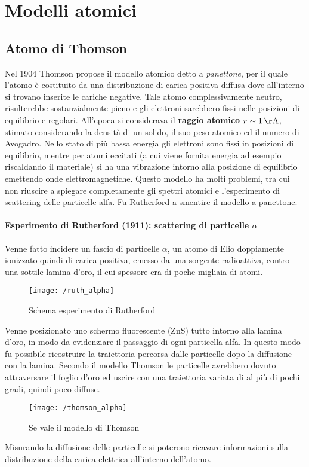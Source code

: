 
\section{Modelli atomici}


\subsection{Atomo di Thomson}
Nel 1904 Thomson propose il modello atomico detto a \textit{panettone}, per il quale l'atomo è costituito da una distribuzione di carica positiva diffusa dove all'interno si trovano inserite le cariche negative.
Tale atomo complessivamente neutro, risulterebbe sostanzialmente pieno e gli elettroni sarebbero fissi nelle posizioni di equilibrio e regolari. 
All'epoca si considerava il \textbf{raggio atomico} $r \sim \SI{1}{\AA}$, stimato considerando la densità di un solido, il suo peso atomico ed il numero di Avogadro.
Nello stato di più bassa energia gli elettroni sono fissi in posizioni di equilibrio, mentre per atomi eccitati (a cui viene fornita energia ad esempio riscaldando il materiale) si ha una vibrazione intorno alla posizione di equilibrio emettendo onde elettromagnetiche.
Questo modello ha molti problemi, tra cui non riuscire a spiegare completamente gli spettri atomici e l'esperimento di scattering delle particelle alfa.
Fu Rutherford a smentire il modello a panettone.


\paragraph{Esperimento di Rutherford (1911): scattering di particelle $\alpha$}
Venne fatto incidere un fascio di particelle $\alpha$, un atomo di Elio doppiamente ionizzato quindi di carica positiva, emesso da una sorgente radioattiva, contro una sottile lamina d'oro, il cui spessore era di poche migliaia di atomi.
\begin{figure}[h]
\centering
\texttt{[image: /ruth\_alpha]}
\caption{Schema esperimento di Rutherford}
\end{figure}
Venne posizionato uno schermo fluorescente (ZnS) tutto intorno alla lamina d'oro, in modo da evidenziare il passaggio di ogni particella alfa.
In questo modo fu possibile ricostruire la traiettoria percorsa dalle particelle dopo la diffusione con la lamina.
Secondo il modello Thomson le particelle avrebbero dovuto attraversare il foglio d'oro ed uscire con una traiettoria variata di al più di pochi gradi, quindi poco diffuse.
\begin{figure}[h]
\centering
\texttt{[image: /thomson\_alpha]}
\caption{Se vale il modello di Thomson}
\end{figure}
Misurando la diffusione delle particelle si poterono ricavare informazioni sulla distribuzione della carica elettrica all'interno dell'atomo.

